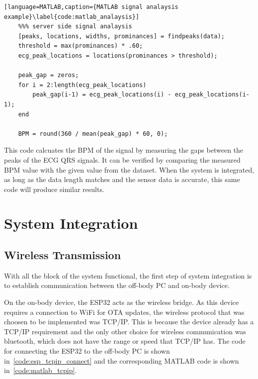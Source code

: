 \begin{lstlisting}[language=MATLAB,caption={MATLAB signal analaysis example}\label{code:matlab_analaysis}]
    %%% server side signal analaysis
    [peaks, locations, widths, prominances] = findpeaks(data);
    threshold = max(prominances) * .60;
    ecg_peak_locations = locations(prominances > threshold);

    peak_gap = zeros;
    for i = 2:length(ecg_peak_locations)
        peak_gap(i-1) = ecg_peak_locations(i) - ecg_peak_locations(i-1);
    end

    BPM = round(360 / mean(peak_gap) * 60, 0);
\end{lstlisting}

This code calcuates the BPM of the signal by measuring the gaps between the peaks of the ECG QRS signals.
It can be verified by comparing the measured BPM value with the given value from the dataset.
When the system is integrated, as long as the data length matches and the sensor data is accurate,
this same code will produce similar results.


\section{System Integration}
\subsection{Wireless Transmission}
With all the block of the system functional,
the first step of system integration is to establish communication between the off-body PC and on-body device.

On the on-body device, the ESP32 acts as the wireless bridge.
As this device requires a connection to WiFi for OTA updates, the wireless protocol that was choosen to be implemented was TCP/IP.
This is because the device already has a TCP/IP requirement and the only other choice for wireless communication was bluetooth, which does not have the range or speed that TCP/IP has.
The code for connecting the ESP32 to the off-body PC is shown in~\autoref{code:esp_tcpip_connect} and the corresponding MATLAB code is shown in~\autoref{code:matlab_tcpip}.

